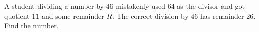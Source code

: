 A student dividing a number by $46$ mistakenly used $64$ as the divisor and got quotient $11$ and some remainder $R$. The correct division by $46$ has remainder $26$. Find the number.
